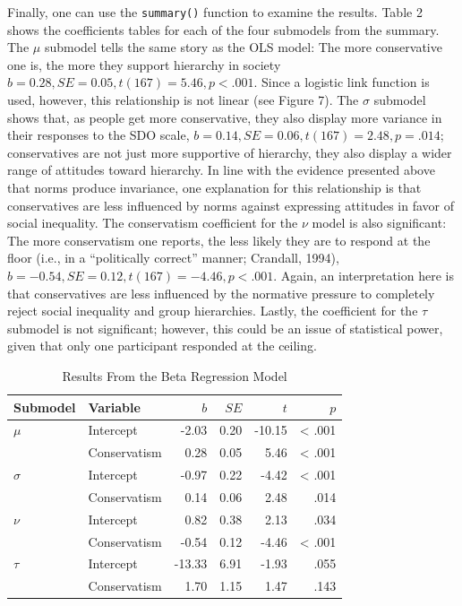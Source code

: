 \documentclass[english,man]{apa6}
\theoremstyle{definition}
\theoremstyle{definition}
\theoremstyle{remark}
\begin{document}
Finally, one can use the \texttt{summary()} function to examine the
results. Table 2 shows the coefficients tables for each of the four
submodels from the summary. The \(\mu\) submodel tells the same story as
the OLS model: The more conservative one is, the more they support
hierarchy in society \(b = 0.28, SE = 0.05, t(167) = 5.46, p < .001\).
Since a logistic link function is used, however, this relationship is
not linear (see Figure 7). The \(\sigma\) submodel shows that, as people
get more conservative, they also display more variance in their
responses to the SDO scale,
\(b = 0.14, SE = 0.06, t(167) = 2.48, p = .014\); conservatives are not
just more supportive of hierarchy, they also display a wider range of
attitudes toward hierarchy. In line with the evidence presented above
that norms produce invariance, one explanation for this relationship is
that conservatives are less influenced by norms against expressing
attitudes in favor of social inequality. The conservatism coefficient
for the \(\nu\) model is also significant: The more conservatism one
reports, the less likely they are to respond at the floor (i.e., in a
``politically correct'' manner; Crandall, 1994),
\(b = -0.54, SE = 0.12, t(167) = -4.46, p < .001\). Again, an
interpretation here is that conservatives are less influenced by the
normative pressure to completely reject social inequality and group
hierarchies. Lastly, the coefficient for the \(\tau\) submodel is not
significant; however, this could be an issue of statistical power, given
that only one participant responded at the ceiling.

\begin{table}[tbp]
\begin{center}
\begin{threeparttable}
\caption{\label{tab:unnamed-chunk-17}Results From the Beta Regression Model}
\begin{tabular}{llrrrr}
\toprule
Submodel & Variable & $b$ & $SE$ & $t$ & $p$\\
\midrule
$\mu$ & Intercept & -2.03 & 0.20 & -10.15 & < .001\\
 & Conservatism & 0.28 & 0.05 & 5.46 & < .001\\
$\sigma$ & Intercept & -0.97 & 0.22 & -4.42 & < .001\\
 & Conservatism & 0.14 & 0.06 & 2.48 & .014\\
$\nu$ & Intercept & 0.82 & 0.38 & 2.13 & .034\\
 & Conservatism & -0.54 & 0.12 & -4.46 & < .001\\
$\tau$ & Intercept & -13.33 & 6.91 & -1.93 & .055\\
 & Conservatism & 1.70 & 1.15 & 1.47 & .143\\
\bottomrule
\end{tabular}
\end{threeparttable}
\end{center}
\end{table}
\end{document}
